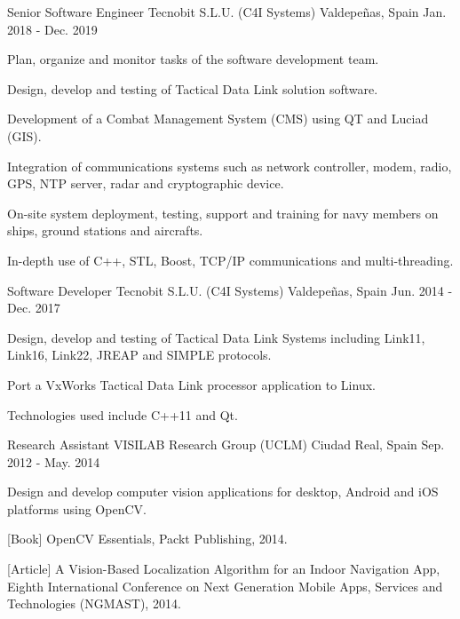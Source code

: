 \begin{cventries}
  \cventry
    {Senior Software Engineer} %
    {Tecnobit S.L.U. (C4I Systems)} %
    {Valdepeñas, Spain} %
    {Jan. 2018 - Dec. 2019} %
    {
      \begin{cvitems} %
        \item {Plan, organize and monitor tasks of the software development team.}
        \item {Design, develop and testing of Tactical Data Link solution software.}
        \item {Development of a Combat Management System (CMS) using QT and Luciad (GIS).}
        \item {Integration of communications systems such as network controller, modem, radio, GPS, NTP server, radar and cryptographic device.}
        \item {On-site system deployment, testing, support and training for navy members on ships, ground stations and aircrafts.}
        \item {In-depth use of C++, STL, Boost, TCP/IP communications and multi-threading.}
      \end{cvitems}
    }

  \cventry
    {Software Developer} %
    {Tecnobit S.L.U. (C4I Systems)} %
    {Valdepeñas, Spain} %
    {Jun. 2014 - Dec. 2017} %
    {
      \begin{cvitems} %
        \item {Design, develop and testing of Tactical Data Link Systems including Link11, Link16, Link22, JREAP and SIMPLE protocols.}
        \item {Port a VxWorks Tactical Data Link processor application to Linux.}
        \item {Technologies used include C++11 and Qt.}
      \end{cvitems}
    }


  \cventry
    {Research Assistant} %
    {VISILAB Research Group (UCLM)} %
    {Ciudad Real, Spain} %
    {Sep. 2012 - May. 2014} %
    {
      \begin{cvitems} %
        \item {Design and develop computer vision applications for desktop, Android and iOS platforms using OpenCV.}
        \item {[Book] OpenCV Essentials, Packt Publishing, 2014.}
        \item {[Article] A Vision-Based Localization Algorithm for an Indoor Navigation App, Eighth International Conference on Next Generation Mobile Apps, Services and Technologies (NGMAST), 2014.}
      \end{cvitems}
    }




\end{cventries}
